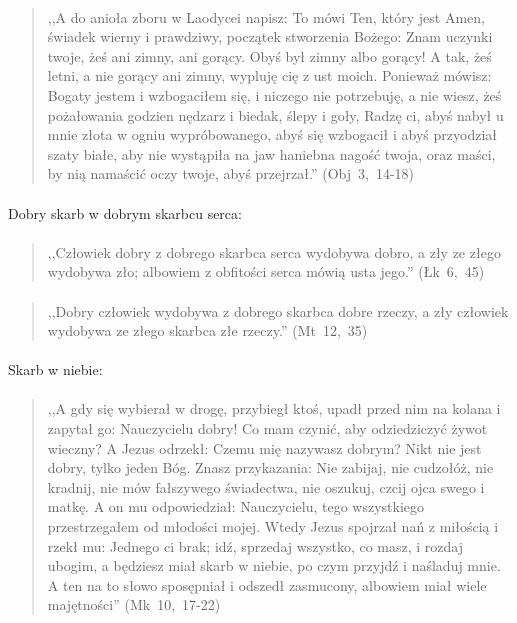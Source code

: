 \documentclass[10pt,a4paper,oneside]{article}
\begin{document}
\paragraph{}
\begin{quote}
,,A do anioła zboru w Laodycei napisz: To mówi Ten, który jest Amen, świadek wierny i prawdziwy, początek stworzenia Bożego: Znam uczynki twoje, żeś ani zimny, ani gorący. Obyś był zimny albo gorący! A tak, żeś letni, a nie gorący ani zimny, wypluję cię z ust moich. Ponieważ mówisz: Bogaty jestem i wzbogaciłem się, i niczego nie potrzebuję, a nie wiesz, żeś pożałowania godzien nędzarz i biedak, ślepy i goły, Radzę ci, abyś nabył u mnie złota w ogniu wypróbowanego, abyś się wzbogacił i abyś przyodział szaty białe, aby nie wystąpiła na jaw haniebna nagość twoja, oraz maści, by nią namaścić oczy twoje, abyś przejrzał.'' \mbox{(Obj 3, 14-18)}
\end{quote}
\paragraph{}
Dobry skarb w dobrym skarbcu serca:
\paragraph{}
\begin{quote}
,,Człowiek dobry z dobrego skarbca serca wydobywa dobro, a zły ze złego wydobywa zło; albowiem z obfitości serca mówią usta jego.'' \mbox{(Łk 6, 45)}
\end{quote}
\paragraph{}
\begin{quote}
,,Dobry człowiek wydobywa z dobrego skarbca dobre rzeczy, a zły człowiek wydobywa ze złego skarbca złe rzeczy.'' \mbox{(Mt 12, 35)}
\end{quote}
\paragraph{}
Skarb w niebie:
\paragraph{}
\begin{quote}
,,A gdy się wybierał w drogę, przybiegł ktoś, upadł przed nim na kolana i zapytał go: Nauczycielu dobry! Co mam czynić, aby odziedziczyć żywot wieczny? A Jezus odrzekł: Czemu mię nazywasz dobrym? Nikt nie jest dobry, tylko jeden Bóg. Znasz przykazania: Nie zabijaj, nie cudzołóż, nie kradnij, nie mów fałszywego świadectwa, nie oszukuj, czcij ojca swego i matkę. A on mu odpowiedział: Nauczycielu, tego wszystkiego przestrzegałem od młodości mojej. Wtedy Jezus spojrzał nań z miłością i rzekł mu: Jednego ci brak; idź, sprzedaj wszystko, co masz, i rozdaj ubogim, a będziesz miał skarb w niebie, po czym przyjdź i naśladuj mnie. A ten na to słowo sposępniał i odszedł zasmucony, albowiem miał wiele majętności'' \mbox{(Mk 10, 17-22)}
\end{quote}
\end{document}
